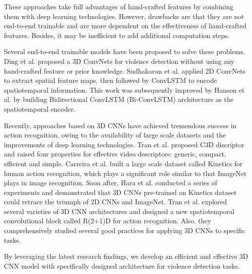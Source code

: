 \documentclass[10pt,twocolumn,letterpaper]{article}
\begin{document}
These approaches take full advantages of hand-crafted features by combining them with deep learning technologies.
However, drawbacks are that they are not end-to-end trainable and are more dependent on the effectiveness of hand-crafted features.
Besides, it may be inefficient to add additional computation steps. 

Several end-to-end trainable models have been proposed to solve these problems.
Ding et al. \cite{3dcnn_ding} proposed a 3D ConvNets for violence detection without using any hand-crafted feature or prior knowledge. 
Sudhakaran et al. \cite{convlstm_sudh} applied 2D ConvNets to extract spatial feature maps, then followed by ConvLSTM \cite{convlstm} to encode spatiotemporal information.
This work was subsequently improved by Hanson et al. \cite{bi_convlstm} by building Bidirectional ConvLSTM (Bi-ConvLSTM) architecture as the spatiotemporal encoder.

Recently, approaches based on 3D CNNs have achieved tremendous success in action recognition, owing to the availability of large scale datasets and the improvements of deep learning technologies. 
Tran et al. \cite{3dcnn_1} proposed C3D discriptor and raised four properties for effective video descriptors: generic, compact, efficient and simple. 
Carreira et al. \cite{kinetics} built a large scale dataset called Kinetics for human action recognition, which plays a significant role similar to that ImageNet \cite{imagenet} plays in image recognition. 
Soon after, Hara et al. \cite{3dcnn_2} conducted a series of experiments and demonstrated that 3D CNNs pre-trained on Kinetics dataset could retrace the triumph of 2D CNNs and ImageNet.
Tran et al. \cite{r2+1d} explored several varieties of 3D CNN architectures and designed a new spatiotemporal convolutional block called R(2+1)D for action recognition.
Also, they comprehensively studied several good practices for applying 3D CNNs to specific tasks.

By leveraging the latest research findings, we develop an efficient and effective 3D CNN model with specifically designed architecture for violence detection tasks.


\end{document}
